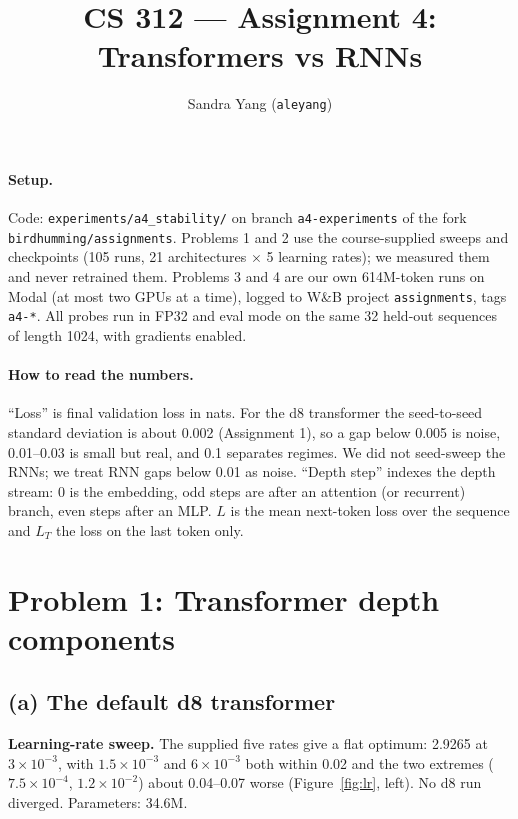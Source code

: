 \documentclass[10pt,letterpaper]{article}
\title{\vspace{-1.6em}CS 312 --- Assignment 4: Transformers vs RNNs\vspace{-0.4em}}
\author{Sandra Yang (\texttt{aleyang})}
\date{\vspace{-0.6em}}
\begin{document}
\maketitle
\vspace{-2em}

\paragraph{Setup.} Code: \texttt{experiments/a4\_stability/} on branch \texttt{a4-experiments} of the fork \texttt{birdhumming/assignments}. Problems 1 and 2 use the course-supplied sweeps and checkpoints (105 runs, 21 architectures $\times$ 5 learning rates); we measured them and never retrained them. Problems 3 and 4 are our own 614M-token runs on Modal (at most two GPUs at a time), logged to W\&B project \texttt{assignments}, tags \texttt{a4-*}. All probes run in FP32 and eval mode on the same 32 held-out sequences of length 1024, with gradients enabled. %

\paragraph{How to read the numbers.} ``Loss'' is final validation loss in nats. For the d8 transformer the seed-to-seed standard deviation is about 0.002 (Assignment 1), so a gap below 0.005 is noise, 0.01--0.03 is small but real, and 0.1 separates regimes. We did not seed-sweep the RNNs; we treat RNN gaps below 0.01 as noise. ``Depth step'' indexes the depth stream: 0 is the embedding, odd steps are after an attention (or recurrent) branch, even steps after an MLP. $L$ is the mean next-token loss over the sequence and $L_T$ the loss on the last token only.

\section*{Problem 1: Transformer depth components}

\subsection*{(a) The default d8 transformer}

\textbf{Learning-rate sweep.} The supplied five rates give a flat optimum: 2.9265 at $3\times10^{-3}$, with $1.5\times10^{-3}$ and $6\times10^{-3}$ both within 0.02 and the two extremes ($7.5\times10^{-4}$, $1.2\times10^{-2}$) about 0.04--0.07 worse (Figure~\ref{fig:lr}, left). No d8 run diverged. Parameters: 34.6M.
\end{document}
